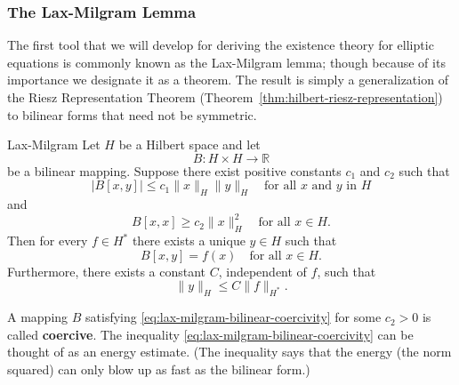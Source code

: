 \subsubsection{The Lax-Milgram Lemma}\label{subsec:lax-milgram-lemma}

The first tool that we will develop for deriving the existence theory for elliptic equations is commonly known as the Lax-Milgram lemma; though because of its importance we designate it as a theorem. The result is simply a generalization of the Riesz Representation Theorem (Theorem~\ref{thm:hilbert-riesz-representation}) to bilinear forms that need not be symmetric.

\begin{Theorem}{Lax-Milgram}
\label{thm:lax-milgram}
Let $H$ be a Hilbert space and let
\begin{equation}\label{eq:lax-milgram-bilinear-mapping-domain}
B:H\times H\to\mathbb{R}
\end{equation}
be a bilinear mapping. Suppose there exist positive constants $c_1$ and $c_2$ such that
\begin{equation}\label{eq:lax-milgram-bilinear-boundedness}
|B[x,y]|\leq c_1\|x\|_H\|y\|_H\quad\text{for all }x\text{ and }y\text{ in }H
\end{equation}
and
\begin{equation}\label{eq:lax-milgram-bilinear-coercivity}
B[x,x]\geq c_2\|x\|_H^2\quad\text{for all }x\in H.
\end{equation}
Then for every $f\in H^*$ there exists a unique $y\in H$ such that
\begin{equation}\label{eq:lax-milgram-variational-solution}
B[x,y]=f(x)\quad\text{for all }x\in H.
\end{equation}
Furthermore, there exists a constant $C$, independent of $f$, such that
\begin{equation}\label{eq:lax-milgram-solution-dual-norm-bound}
\|y\|_H\leq C\|f\|_{H^*}.
\end{equation}

\end{Theorem}

\begin{Remark}
\label{rem:coercive-form-energy-estimate}
A mapping $B$ satisfying \eqref{eq:lax-milgram-bilinear-coercivity} for some $c_2>0$ is called \textbf{coercive}. The inequality \eqref{eq:lax-milgram-bilinear-coercivity} can be thought of as an energy estimate. (The inequality says that the energy (the norm squared) can only blow up as fast as the bilinear form.)
\end{Remark}

